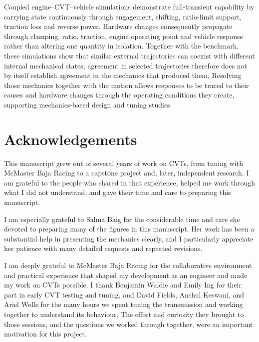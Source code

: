 \documentclass[11pt]{report}
\numberwithin{equation}{section}
\begin{document}
Coupled engine--CVT--vehicle simulations demonstrate full-transient capability by carrying state
continuously through engagement, shifting, ratio-limit support, traction loss and reverse power.
Hardware changes consequently propagate through clamping, ratio, traction, engine operating point
and vehicle response rather than altering one quantity in isolation. Together with the benchmark,
these simulations show that similar external trajectories can coexist with different internal mechanical
states; agreement in selected trajectories therefore does not by itself establish agreement in the
mechanics that produced them. Resolving those mechanics together with the motion allows responses
to be traced to their causes and hardware changes through the operating conditions they create,
supporting mechanics-based design and tuning studies.

\chapter*{Acknowledgements}

This manuscript grew out of several years of work on CVTs, from tuning with 
McMaster Baja Racing to a capstone project and, later, independent research. 
I am grateful to the people who shared in that experience, helped me work 
through what I did not understand, and gave their time and care to preparing 
this manuscript.

I am especially grateful to Salma Baig for the considerable time and care she 
devoted to preparing many of the figures in this manuscript. Her work has been 
a substantial help in presenting the mechanics clearly, and I particularly 
appreciate her patience with many detailed requests and repeated revisions.

I am deeply grateful to McMaster Baja Racing for the collaborative environment 
and practical experience that shaped my development as an engineer and made 
my work on CVTs possible. I thank Benjamin Waldie and Emily Ing for their part 
in early CVT testing and tuning, and David Fields, Anshul Keswani, 
and Ariel Wolle for the many hours we spent tuning the transmission and working 
together to understand its behaviour. The effort and curiosity they brought to 
those sessions, and the questions we worked through together, were an important 
motivation for this project.
\end{document}
